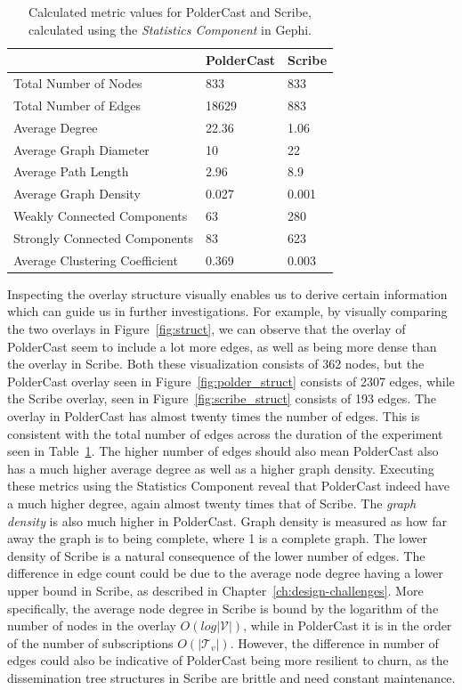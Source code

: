 \begin{table}[h!]
    \centering
    \begin{tabular}{|l | l | l |}
        \hline
        & PolderCast & Scribe \\ \hline
        \hline
        Total Number of Nodes & 833 & 833 \\ \hline
        Total Number of Edges & 18629 & 883 \\ \hline
        Average Degree & 22.36 & 1.06 \\ \hline
        Average Graph Diameter & 10 & 22 \\ \hline
        Average Path Length & 2.96 & 8.9 \\ \hline
        Average Graph Density & 0.027 & 0.001 \\ \hline
        Weakly Connected Components & 63 & 280 \\ \hline
        Strongly Connected Components & 83 & 623 \\ \hline
        Average Clustering Coefficient & 0.369 & 0.003 \\ \hline

    \end{tabular}
    \caption{Calculated metric values for PolderCast and Scribe, calculated using
        the \emph{Statistics Component} in Gephi.}
    \label{tab:struct_metrics}
\end{table}

Inspecting the overlay structure visually enables us to derive certain
information which can guide us in further investigations. For example,
by visually comparing the two overlays in Figure~\ref{fig:struct}, we
can observe that the overlay of PolderCast seem to include a lot more
edges, as well as being more dense than the overlay in Scribe. Both
these visualization consists of 362 nodes, but the PolderCast overlay
seen in Figure~\ref{fig:polder_struct} consists of 2307 edges, while the
Scribe overlay, seen in Figure~\ref{fig:scribe_struct} consists of 193
edges. The overlay in PolderCast has almost twenty times the number of
edges. This is consistent with the total number of edges across the
duration of the experiment seen in Table~\ref{tab:struct_metrics}. The
higher number of edges should also mean PolderCast also has a much
higher average degree as well as a higher graph density. Executing these
metrics using the Statistics Component reveal that PolderCast indeed
have a much higher degree, again almost twenty times that of Scribe. The
\emph{graph density} is also much higher in PolderCast. Graph density is
measured as how far away the graph is to being complete, where 1 is a
complete graph. The lower density of Scribe is a natural consequence of
the lower number of edges. The difference in edge count could be due to the
average node degree having a lower upper bound in Scribe, as described
in Chapter~\ref{ch:design-challenges}. More specifically, the average
node degree in Scribe is bound by the logarithm of the number of nodes
in the overlay $O(log |\mathcal V|)$, while in PolderCast it is in the
order of the number of subscriptions $O(|\mathcal T_v|)$. However, the
difference in number of edges could also be indicative of PolderCast
being more resilient to churn, as the dissemination tree structures in
Scribe are brittle and need constant maintenance.

